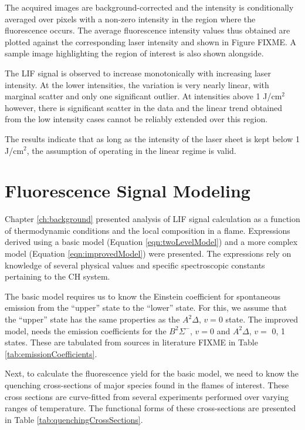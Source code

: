 The acquired images are background-corrected and the intensity is conditionally averaged over pixels with a non-zero intensity in the region where the fluorescence occurs.
The average fluorescence intensity values thus obtained are plotted against the corresponding laser intensity and shown in Figure FIXME.
A sample image highlighting the region of interest is also shown alongside.

The LIF signal is observed to increase monotonically with increasing laser intensity.
At the lower intensities, the variation is very nearly linear, with marginal scatter and only one significant outlier.
At intensities above 1 J/cm\(^2\) however, there is significant scatter in the data and the linear trend obtained from the low intensity cases cannot be reliably extended over this region.

The results indicate that as long as the intensity of the laser sheet is kept below 1 J/cm\(^2\), the assumption of operating in the linear regime is valid.

\section{Fluorescence Signal Modeling}
\label{sec:chplif-fluorescence-signal-modeling}

Chapter \ref{ch:background} presented analysis of LIF signal calculation as a function of thermodynamic conditions and the local composition in a flame.
Expressions derived using a basic model (Equation \ref{eqn:twoLevelModel}) and a more complex model (Equation \ref{eqn:improvedModel}) were presented.
The expressions rely on knowledge of several physical values and specific spectroscopic constants pertaining to the CH system.



The basic model requires us to know the Einstein coefficient for spontaneous emission from the ``upper'' state to the ``lower'' state.
For this, we assume that the ``upper'' state has the same properties as the \(A^2\Delta\), \(v = 0\) state.
The improved model, needs the emission coefficients for the \(B^2\Sigma^-\), \(v = 0\) and \(A^2\Delta\), \(v =\) 0, 1 states.
These are tabulated from sources in literature\cite{1985-garland-a,1996-luque-b} FIXME in Table \ref{tab:emissionCoefficients}.



Next, to calculate the fluorescence yield for the basic model, we need to know the quenching cross-sections of major species found in the flames of interest.
These cross sections are curve-fitted from several experiments performed over varying ranges of temperature.
The functional forms of these cross-sections are presented in Table \ref{tab:quenchingCrossSections}.

